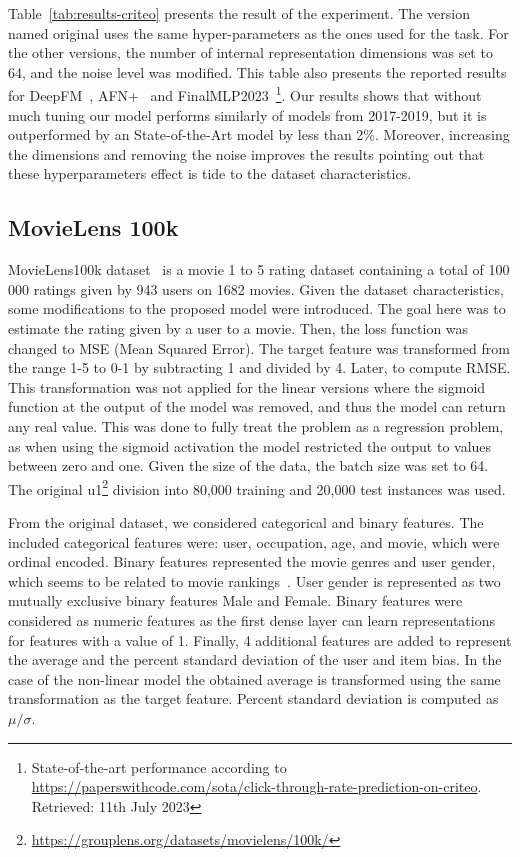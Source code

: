 \documentclass[manuscript,nonacm]{acmart}
\begin{document}
Table~\ref{tab:results-criteo} presents the result of the experiment. The version named original uses the same hyper-parameters as the ones used for the task. For the other versions, the number of internal representation dimensions was set to 64, and the noise level was modified. This table also presents the reported results for DeepFM~\cite{deepfm17}, AFN+~\cite{afn_criteo} and FinalMLP2023~\cite{FinalMLP2023}\footnote{State-of-the-art performance according to \url{https://paperswithcode.com/sota/click-through-rate-prediction-on-criteo}. Retrieved: 11th July 2023}. Our results shows that without much tuning our model performs similarly of models from 2017-2019, but it is outperformed by an State-of-the-Art model by less than 2\%. Moreover, increasing the dimensions and removing the noise improves the results pointing out that these hyperparameters effect is tide to the dataset characteristics. 

\subsection{MovieLens 100k}

MovieLens100k dataset~\cite{movielens} is a movie 1 to 5 rating dataset containing a total of 100\,000 ratings given by 943 users on 1682 movies. Given the dataset characteristics, some modifications to the proposed model were introduced. The goal here was to estimate the rating given by a user to a movie. Then, the loss function was changed to MSE (Mean Squared Error). The target feature was transformed from the range 1-5 to 0-1 by subtracting 1 and divided by 4. Later, to compute RMSE. This transformation was not applied for the linear versions where the sigmoid function at the output of the model was removed, and thus the model can return any real value. This was done to fully treat the problem as a regression problem, as when using the sigmoid activation the model restricted the output to values between zero and one. Given the size of the data, the batch size was set to 64. The original u1\footnote{\url{https://grouplens.org/datasets/movielens/100k/}} division into 80,000 training and 20,000 test instances was used.

From the original dataset, we considered categorical and binary features. The included categorical features were: user, occupation, age, and movie, which were ordinal encoded. Binary features represented the movie genres and user gender, which seems to be related to movie rankings~\cite{gender_ml}. User gender is represented as two mutually exclusive binary features Male and Female. Binary features were considered as numeric features as the first dense layer can learn representations for features with a value of 1. Finally, 4 additional features are added to represent the average and the percent standard deviation of the user and item bias. In the case of the non-linear model the obtained average is transformed using the same transformation as the target feature. Percent standard deviation is computed as $\mu / \sigma$.
\end{document}
